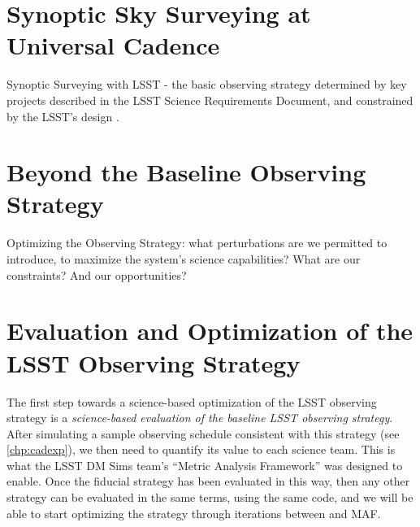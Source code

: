 
\section{Synoptic Sky Surveying at Universal Cadence}
\def\secname{intro:baseline}\label{sec:\secname}

Synoptic Surveying with LSST - the basic observing strategy determined
by key projects described in the LSST Science Requirements Document,
and constrained by the LSST's design \citep{IvezicEtal2008}.


\section{Beyond the Baseline Observing Strategy}
\def\secname{intro:baseline}\label{sec:\secname}

Optimizing the Observing Strategy: what perturbations are we
permitted to introduce, to maximize the system's science capabilities?
What are our constraints? And our opportunities?


\section{Evaluation and Optimization of the LSST Observing Strategy}
\def\secname{intro:evaluation}\label{sec:\secname}

The first step towards a science-based optimization of the LSST
observing strategy is a {\it science-based evaluation of the baseline
LSST observing strategy}. After simulating a sample  observing
schedule consistent with this strategy (see  \autoref{chp:cadexp}), we
then need to quantify its value to each science team. This is what the
LSST DM Sims team's ``Metric Analysis Framework''  was designed to
enable. Once the fiducial strategy has been evaluated in this way,
then any other strategy can be evaluated in the same terms, using the
same code, and we will be able to start optimizing the strategy
through iterations between \OpSim and MAF.

